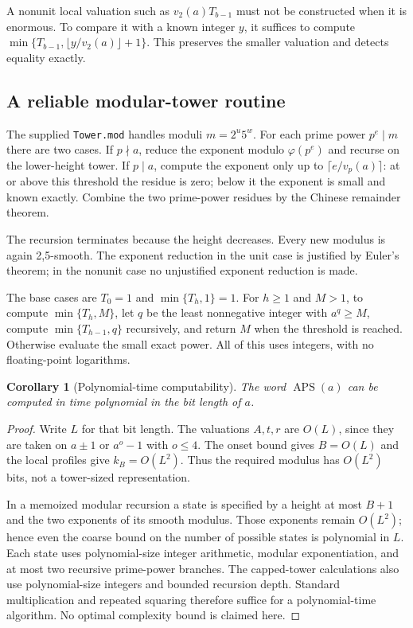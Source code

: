 \documentclass[11pt,letterpaper]{article}
\numberwithin{equation}{section}
\newtheorem{corollary}[theorem]{Corollary}
\theoremstyle{definition}
\newcommand{\APS}{\operatorname{APS}}
\begin{document}
A nonunit local valuation such as $v_2(a)T_{b-1}$ must not be constructed when
it is enormous. To compare it with a known integer $y$, it suffices to compute
$\min\{T_{b-1},\lfloor y/v_2(a)\rfloor+1\}$. This preserves the smaller
valuation and detects equality exactly.

\subsection{A reliable modular-tower routine}
The supplied \texttt{Tower.mod} handles moduli $m=2^u5^w$. For each prime power
$p^e\mid m$ there are two cases. If $p\nmid a$, reduce the exponent modulo
$\varphi(p^e)$ and recurse on the lower-height tower. If $p\mid a$, compute
the exponent only up to $\lceil e/v_p(a)\rceil$: at or above this threshold the
residue is zero; below it the exponent is small and known exactly. Combine
the two prime-power residues by the Chinese remainder theorem.

The recursion terminates because the height decreases. Every new modulus is
again 2,5-smooth. The exponent reduction in the unit case is justified by
Euler's theorem; in the nonunit case no unjustified exponent reduction is
made.

The base cases are $T_0=1$ and $\min\{T_h,1\}=1$.
For $h\geq1$ and $M>1$, to compute $\min\{T_h,M\}$, let $q$ be the least nonnegative integer with
$a^q\geq M$, compute $\min\{T_{h-1},q\}$ recursively, and return $M$ when
the threshold is reached. Otherwise evaluate the small exact power. All of
this uses integers, with no floating-point logarithms.

\begin{corollary}[Polynomial-time computability]\label{cor:complexity}
The word $\APS(a)$ can be computed in time polynomial in the bit length of $a$.
\end{corollary}
\begin{proof}
Write $L$ for that bit length. The valuations $A,t,r$ are $O(L)$, since they
are taken on $a\pm1$ or $a^o-1$ with $o\leq4$. The onset bound gives
$B=O(L)$ and the local profiles give $k_B=O(L^2)$. Thus the required modulus
has $O(L^2)$ bits, not a tower-sized representation.

In a memoized modular recursion a state is specified by a height at most
$B+1$ and the two exponents of its smooth modulus. Those exponents remain
$O(L^2)$; hence even the coarse bound on the number of possible states is
polynomial in $L$. Each state uses polynomial-size integer arithmetic,
modular exponentiation, and at most two recursive prime-power branches.
The capped-tower calculations also use polynomial-size integers and bounded
recursion depth. Standard multiplication and repeated squaring therefore
suffice for a polynomial-time algorithm. No optimal complexity bound is
claimed here.
\end{proof}
\end{document}

